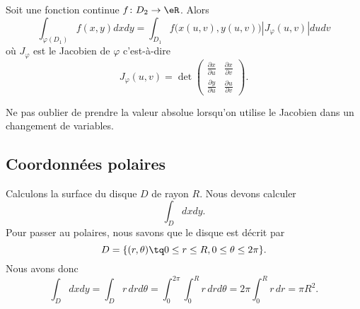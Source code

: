 \begin{theorem}     \label{ThoChamDeVarIntDDf}
	Soit une fonction continue \( f\colon D_2\to \eR\). Alors
	\begin{equation}
		\int_{\varphi(D_1)}f(x,y)dxdy=\int_{D_1}f\big( x(u,v),y(u,v) \big)| J_{\varphi}(u,v) |dudv
	\end{equation}
	où \( J_{\varphi}\) est le Jacobien de \( \varphi\) c'est-à-dire
	\begin{equation}
		J_{\varphi}(u,v)=\det\begin{pmatrix}
			\frac{ \partial x }{ \partial u } & \frac{ \partial x }{ \partial v } \\
			\frac{ \partial y }{ \partial u } & \frac{ \partial u }{ \partial v }
		\end{pmatrix}.
	\end{equation}
\end{theorem}
Ne pas oublier de prendre la valeur absolue lorsqu'on utilise le Jacobien dans un changement de variables.

\subsection{Coordonnées polaires}

\begin{example}
	Calculons la surface du disque \( D\) de rayon \( R\). Nous devons calculer
	\begin{equation}
		\int_Ddxdy.
	\end{equation}
	Pour passer au polaires, nous savons que le disque est décrit par
	\begin{equation}
		D=\{ (r,\theta)\tq 0\leq r\leq R,0\leq\theta\leq 2\pi \}.
	\end{equation}
	Nous avons donc
	\begin{equation}
		\int_Ddxdy=\int_{D}r\,drd\theta=\int_0^{2\pi}\int_0^Rr\,drd\theta=2\pi\int_0^Rr\,dr=\pi R^2.
	\end{equation}
\end{example}

